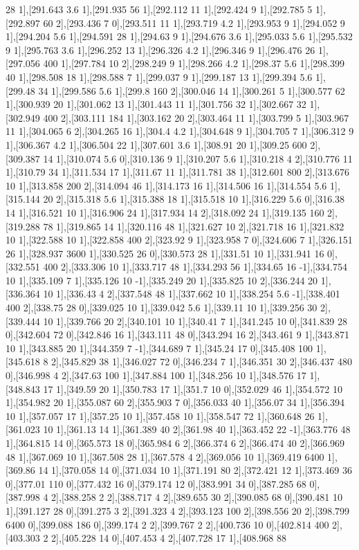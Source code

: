 {28 1],[291.643 3.6 1],[291.935 56 1],[292.112 11 1],[292.424 9 1],[292.785 5 1],[292.897 60 2],[293.436 7 0],[293.511 11 1],[293.719 4.2 1],[293.953 9 1],[294.052 9 1],[294.204 5.6 1],[294.591 28 1],[294.63 9 1],[294.676 3.6 1],[295.033 5.6 1],[295.532 9 1],[295.763 3.6 1],[296.252 13 1],[296.326 4.2 1],[296.346 9 1],[296.476 26 1],[297.056 400 1],[297.784 10 2],[298.249 9 1],[298.266 4.2 1],[298.37 5.6 1],[298.399 40 1],[298.508 18 1],[298.588 7 1],[299.037 9 1],[299.187 13 1],[299.394 5.6 1],[299.48 34 1],[299.586 5.6 1],[299.8 160 2],[300.046 14 1],[300.261 5 1],[300.577 62 1],[300.939 20 1],[301.062 13 1],[301.443 11 1],[301.756 32 1],[302.667 32 1],[302.949 400 2],[303.111 184 1],[303.162 20 2],[303.464 11 1],[303.799 5 1],[303.967 11 1],[304.065 6 2],[304.265 16 1],[304.4 4.2 1],[304.648 9 1],[304.705 7 1],[306.312 9 1],[306.367 4.2 1],[306.504 22 1],[307.601 3.6 1],[308.91 20 1],[309.25 600 2],[309.387 14 1],[310.074 5.6 0],[310.136 9 1],[310.207 5.6 1],[310.218 4 2],[310.776 11 1],[310.79 34 1],[311.534 17 1],[311.67 11 1],[311.781 38 1],[312.601 800 2],[313.676 10 1],[313.858 200 2],[314.094 46 1],[314.173 16 1],[314.506 16 1],[314.554 5.6 1],[315.144 20 2],[315.318 5.6 1],[315.388 18 1],[315.518 10 1],[316.229 5.6 0],[316.38 14 1],[316.521 10 1],[316.906 24 1],[317.934 14 2],[318.092 24 1],[319.135 160 2],[319.288 78 1],[319.865 14 1],[320.116 48 1],[321.627 10 2],[321.718 16 1],[321.832 10 1],[322.588 10 1],[322.858 400 2],[323.92 9 1],[323.958 7 0],[324.606 7 1],[326.151 26 1],[328.937 3600 1],[330.525 26 0],[330.573 28 1],[331.51 10 1],[331.941 16 0],[332.551 400 2],[333.306 10 1],[333.717 48 1],[334.293 56 1],[334.65 16 -1],[334.754 10 1],[335.109 7 1],[335.126 10 -1],[335.249 20 1],[335.825 10 2],[336.244 20 1],[336.364 10 1],[336.43 4 2],[337.548 48 1],[337.662 10 1],[338.254 5.6 -1],[338.401 400 2],[338.75 28 0],[339.025 10 1],[339.042 5.6 1],[339.11 10 1],[339.256 30 2],[339.444 10 1],[339.766 20 2],[340.101 10 1],[340.41 7 1],[341.245 10 0],[341.839 28 0],[342.604 72 0],[342.846 16 1],[343.111 48 0],[343.294 16 2],[343.461 9 1],[343.871 10 1],[343.885 20 1],[344.359 7 -1],[344.689 7 1],[345.24 17 0],[345.408 100 1],[345.618 8 2],[345.829 38 1],[346.027 72 0],[346.234 7 1],[346.351 30 2],[346.437 480 0],[346.998 4 2],[347.63 100 1],[347.884 100 1],[348.256 10 1],[348.576 17 1],[348.843 17 1],[349.59 20 1],[350.783 17 1],[351.7 10 0],[352.029 46 1],[354.572 10 1],[354.982 20 1],[355.087 60 2],[355.903 7 0],[356.033 40 1],[356.07 34 1],[356.394 10 1],[357.057 17 1],[357.25 10 1],[357.458 10 1],[358.547 72 1],[360.648 26 1],[361.023 10 1],[361.13 14 1],[361.389 40 2],[361.98 40 1],[363.452 22 -1],[363.776 48 1],[364.815 14 0],[365.573 18 0],[365.984 6 2],[366.374 6 2],[366.474 40 2],[366.969 48 1],[367.069 10 1],[367.508 28 1],[367.578 4 2],[369.056 10 1],[369.419 6400 1],[369.86 14 1],[370.058 14 0],[371.034 10 1],[371.191 80 2],[372.421 12 1],[373.469 36 0],[377.01 110 0],[377.432 16 0],[379.174 12 0],[383.991 34 0],[387.285 68 0],[387.998 4 2],[388.258 2 2],[388.717 4 2],[389.655 30 2],[390.085 68 0],[390.481 10 1],[391.127 28 0],[391.275 3 2],[391.323 4 2],[393.123 100 2],[398.556 20 2],[398.799 6400 0],[399.088 186 0],[399.174 2 2],[399.767 2 2],[400.736 10 0],[402.814 400 2],[403.303 2 2],[405.228 14 0],[407.453 4 2],[407.728 17 1],[408.968 88 }
